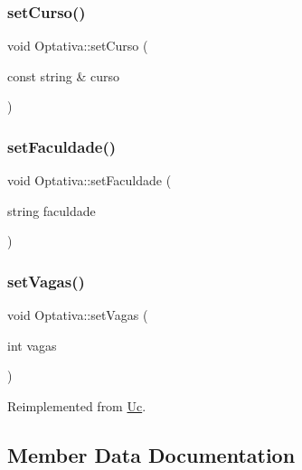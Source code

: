 \hypertarget{class_optativa_a3d34759cecccd98c4edd1cd834b5d622}{}\label{class_optativa_a3d34759cecccd98c4edd1cd834b5d622} 
\subsubsection{\texorpdfstring{set\+Curso()}{setCurso()}}
{\footnotesize\ttfamily void Optativa\+::set\+Curso (\begin{DoxyParamCaption}\item[{const string \&}]{curso }\end{DoxyParamCaption})}

\hypertarget{class_optativa_a4f96f2082762900b85660e0fd4bff682}{}\label{class_optativa_a4f96f2082762900b85660e0fd4bff682} 
\subsubsection{\texorpdfstring{set\+Faculdade()}{setFaculdade()}}
{\footnotesize\ttfamily void Optativa\+::set\+Faculdade (\begin{DoxyParamCaption}\item[{string}]{faculdade }\end{DoxyParamCaption})}

\hypertarget{class_optativa_a5b123e4f96894d9ff8fb4e6f500ce40d}{}\label{class_optativa_a5b123e4f96894d9ff8fb4e6f500ce40d} 
\subsubsection{\texorpdfstring{set\+Vagas()}{setVagas()}}
{\footnotesize\ttfamily void Optativa\+::set\+Vagas (\begin{DoxyParamCaption}\item[{int}]{vagas }\end{DoxyParamCaption})\hspace{0.3cm}{\ttfamily [virtual]}}



Reimplemented from \hyperlink{class_uc_a41b665e518e252eead3d8425696cddf3}{Uc}.



\subsection{Member Data Documentation}
\hypertarget{class_optativa_ac4fb0a80ff662efca795bf932bea9a77}{}\label{class_optativa_ac4fb0a80ff662efca795bf932bea9a77} 
